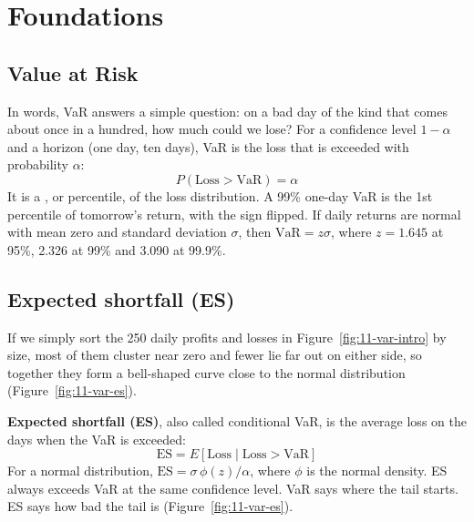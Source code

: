 \section{Foundations}
\label{sec:11-foundations}

\subsection{Value at Risk}

In words, VaR answers a simple question: on a bad day of the kind that comes about once in a hundred, how much could we lose? For a confidence level $1 - \alpha$ and a horizon (one day, ten days), VaR is the loss that is exceeded with probability $\alpha$:
\begin{equation}
  P(\text{Loss} > \mathrm{VaR}) = \alpha
  \label{eq:11-var}
\end{equation}
It is a , or percentile, of the loss distribution. A 99\% one-day VaR is the 1st percentile of tomorrow's return, with the sign flipped. If daily returns are normal with mean zero and standard deviation $\sigma$, then $\mathrm{VaR} = z\sigma$, where $z = 1.645$ at 95\%, 2.326 at 99\% and 3.090 at 99.9\%.

\subsection{Expected shortfall (ES)}
If we simply sort the 250 daily profits and losses in Figure~\ref{fig:11-var-intro} by size, most of them cluster near zero and fewer lie far out on either side, so together they form a bell-shaped curve close to the normal distribution (Figure~\ref{fig:11-var-es}). 

\textbf{Expected shortfall (ES)}, also called conditional VaR, is the average loss on the days when the VaR is exceeded:
\begin{equation}
  \mathrm{ES} = E[\text{Loss} \mid \text{Loss} > \mathrm{VaR}]
  \label{eq:11-es}
\end{equation}
For a normal distribution, $\mathrm{ES} = \sigma\,\phi(z)/\alpha$, where $\phi$ is the normal density. ES always exceeds VaR at the same confidence level. VaR says where the tail starts. ES says how bad the tail is (Figure~\ref{fig:11-var-es}).

